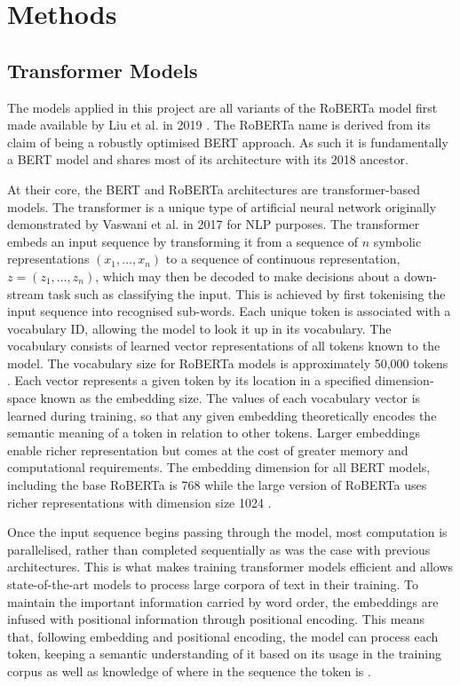 \documentclass[12pt]{report}
\begin{document}
\section{Methods}

\subsection{Transformer Models}
The models applied in this project are all variants of the RoBERTa model first made available by Liu et al. in 2019 \cite{roberta}.
The RoBERTa name is derived from its claim of being a robustly optimised BERT approach.
As such it is fundamentally a BERT model and shares most of its architecture with its 2018 ancestor.

At their core, the BERT and RoBERTa architectures are transformer-based models.
The transformer is a unique type of artificial neural network originally demonstrated by Vaswani et al. in 2017 \cite{Vaswani2017} for NLP purposes.
The transformer embeds an input sequence by transforming it from a sequence of $n$ symbolic representations $(x_1, \ldots, x_n)$ to a sequence of continuous representation, $z = (z_1, \ldots, z_n)$, which may then be decoded to make decisions about a down-stream task such as classifying the input.
This is achieved by first tokenising the input sequence into recognised sub-words.
Each unique token is associated with a vocabulary ID, allowing the model to look it up in its vocabulary.
The vocabulary consists of learned vector representations of all tokens known to the model.
The vocabulary size for RoBERTa models is approximately 50,000 tokens \cite{roberta}.
Each vector represents a given token by its location in a specified dimension-space known as the embedding size.
The values of each vocabulary vector is learned during training, so that any given embedding theoretically encodes the semantic meaning of a token in relation to other tokens.
Larger embeddings enable richer representation but comes at the cost of greater memory and computational requirements.
The embedding dimension for all BERT models, including the base RoBERTa is 768 while the large version of RoBERTa uses richer representations with dimension size 1024 \cite{BERT,roberta}.

Once the input sequence begins passing through the model, most computation is parallelised, rather than completed sequentially as was the case with previous architectures.
This is what makes training transformer models efficient and allows state-of-the-art models to process large corpora of text in their training.
To maintain the important information carried by word order, the embeddings are infused with positional information through positional encoding.
This means that, following embedding and positional encoding, the model can process each token, keeping a semantic understanding of it based on its usage in the training corpus as well as knowledge of where in the sequence the token is \cite{Vaswani2017}.
\end{document}

